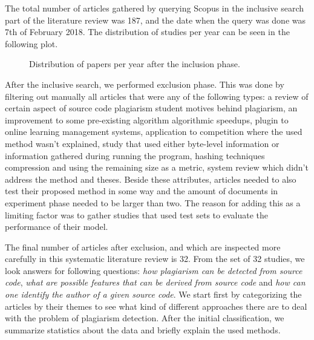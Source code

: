 The total number of articles gathered by querying Scopus in the inclusive search part of the literature review was 187, and the date when the query was done was 7th of February 2018. The distribution of studies per year can be seen in the following plot.


\begin{figure}[ht]
\centering
\setlength\figureheight{7cm}
\setlength\figurewidth{\textwidth}

\caption{Distribution of papers per year after the inclusion phase.}
\end{figure}

After the inclusive search, we performed exclusion phase. This was done by filtering out manually all articles that were any of the following types: a review of certain aspect of source code plagiarism \eg student motives behind plagiarism, an improvement to some pre-existing algorithm \eg algorithmic speedups, plugin to online learning management systems, application to competition where the used method wasn't explained, study that used either byte-level information or information gathered during running the program, hashing techniques \eg compression and using the remaining size as a metric, system review which didn't address the method and theses. Beside these attributes, articles needed to also test their proposed method in some way and the amount of documents in experiment phase needed to be larger than two. The reason for adding this as a limiting factor was to gather studies that used test sets to evaluate the performance of their model.

The final number of articles after exclusion, and which are inspected more carefully in this systematic literature review is 32. From the set of 32 studies, we look answers for following questions: \emph{how plagiarism can be detected from source code}, \emph{what are possible features that can be derived from source code} and \emph{how can one identify the author of a given source code}. We start first by categorizing the articles by their themes to see what kind of different approaches there are to deal with the problem of plagiarism detection. After the initial classification, we summarize statistics about the data and briefly explain the used methods.



